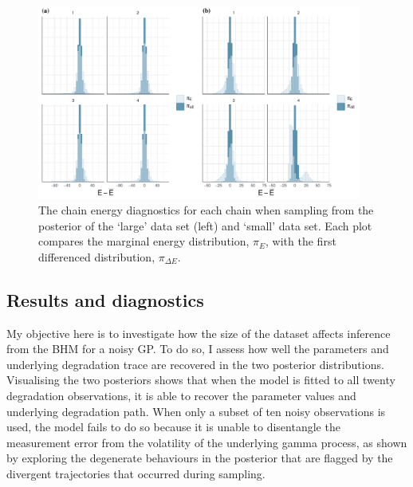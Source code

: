 \begin{figure}[tbp]
  \centering
  \includegraphics[width=0.95\textwidth]{./figures/ch-4/nuts_energy.pdf}
  \caption{The chain energy diagnostics for each chain when sampling from the posterior of the `large' data set (left) and `small' data set. Each plot compares the marginal energy distribution, $\pi_E$, with the first differenced distribution, $\pi_{\Delta E}$.}
  \label{fig:nuts-energies}
\end{figure}

\subsection{Results and diagnostics} \label{sec:noisy-GP-results}

My objective here is to investigate how the size of the dataset affects inference from the BHM for a noisy GP. To do so, I assess how well the parameters and underlying degradation trace are recovered in the two posterior distributions. Visualising the two posteriors shows that when the model is fitted to all twenty degradation observations, it is able to recover the parameter values and underlying degradation path. When only a subset of ten noisy observations is used, the model fails to do so because it is unable to disentangle the measurement error from the volatility of the underlying gamma process, as shown by exploring the degenerate behaviours in the posterior that are flagged by the divergent trajectories that occurred during sampling. 

